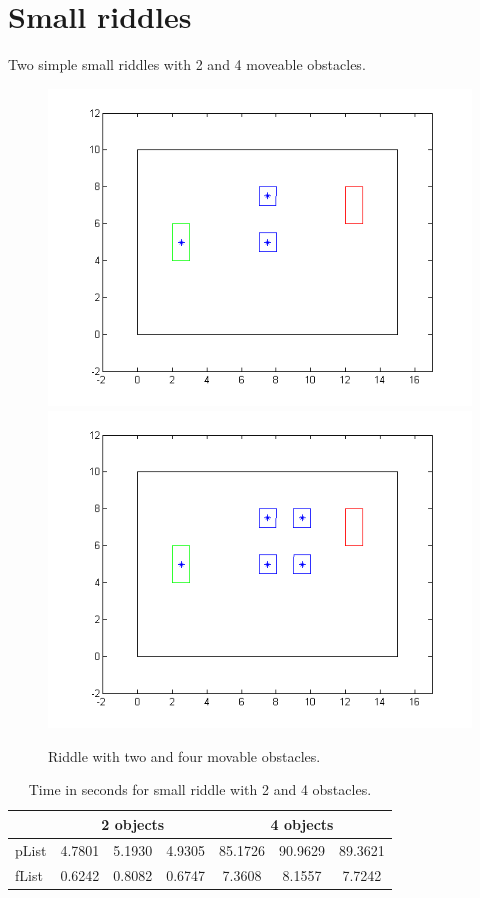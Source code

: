 \section{Small riddles}
Two simple small riddles with 2 and 4 moveable obstacles.
\begin{figure}[H]
\includegraphics[scale = 0.5]{riddle2}
\includegraphics[scale = 0.5]{riddle4}
\caption{Riddle with two and four movable obstacles.}
\end{figure}
\begin{table}[H]
\centering
\begin{tabular}{l||c|c|c||c|c|c}
& \multicolumn{3}{c||}{2 objects} &\multicolumn{3}{c}{4 objects}\\\hline\hline
pList & 4.7801& 5.1930&4.9305& 85.1726 & 90.9629 & 89.3621\\
fList  & 0.6242 & 0.8082& 0.6747  & 7.3608 & 8.1557 & 7.7242\\
\end{tabular}
\caption{Time in seconds for small riddle with 2 and 4 obstacles.}
\end{table}

